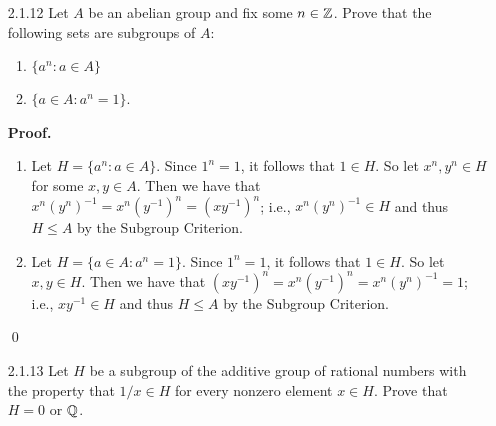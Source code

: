 \begin{enumerate}
      \begin{enumerate}
         \item Let $H = \{(a, 1) : a \in A\}$. We have $(1, 1) \in H$, so that
               $H$ is nonempty. Now let $(x, 1), (y, 1) \in H$. It follows that
               $(x, 1)(y, 1)^{-1} = (x, 1)(y^{-1}, 1) = (xy^{-1}, 1) \in H$, so 
               that $H \le A \times B$.
         \item Let $H = \{(1, b) : b \in B\}$. We have $(1, 1) \in H$, so that
               $H$ is nonempty. Now let $(1, x), (1, y) \in H$. It follows that 
               $(1, x)(1, y)^{-1} = (1, x)(1, y^{-1}) = (1, xy^{-1}) \in H$, so 
               that $H \le A \times B$.
         \item Let $H = \{(a, a) : a \in A\}$. We have $(1, 1) \in H$, so that
               $H$ is nonempty. Now let $(x, x), (y, y) \in H$. It follows that 
               $(x, x)(y, y)^{-1} = (x, x)(y^{-1}, y^{-1}) = (xy^{-1}, xy^{-1}) 
               \in H$, so that $H \le A \times A$.
      \end{enumerate}
      All conclusions followed from the Subgroup Criterion. \qed
   \item[2.1.12]  Let $A$ be an abelian group and fix some $n \in \mathbb{Z}$. Prove
                  that the following sets are subgroups of $A$:
                  \begin{enumerate}
                     \item $\{a^n : a \in A\}$
                     \item $\{a \in A : a^n = 1\}$.
                  \end{enumerate}

      \textbf{Proof.}

      \begin{enumerate}
         \item Let $H = \{a^n : a \in A\}$. Since $1^n = 1$, it follows that
               $1 \in H$. So let $x^n, y^n \in H$ for some $x, y \in A$. Then we 
               have that $x^n(y^n)^{-1} = x^n(y^{-1})^n = (xy^{-1})^n$; i.e.,
               $x^n(y^n)^{-1} \in H$ and thus $H \le A$ by the Subgroup
               Criterion.
         \item Let $H = \{a \in A : a^n=1\}$. Since $1^n = 1$, it follows that
               $1 \in H$. So let $x, y \in H$. Then we have that
               $(xy^{-1})^n = x^n(y^{-1})^n = x^n(y^n)^{-1} = 1$; i.e.,
               $xy^{-1} \in H$ and thus $H \le A$ by the Subgroup Criterion.
      \end{enumerate} \qed
   \item[2.1.13]  Let $H$ be a subgroup of the additive group of rational
                  numbers with the property that $1/x \in H$ for every nonzero
                  element $x \in H$. Prove that $H = 0$ or $\mathbb{Q}$.


\end{enumerate}
